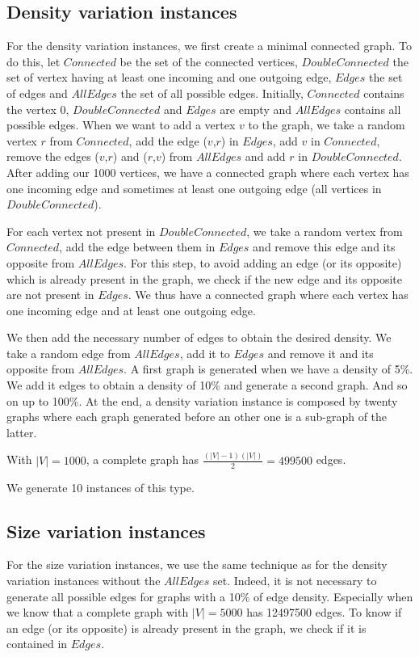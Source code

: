 \subsection{Density variation instances}
For the density variation instances, we first create a minimal connected graph. To do this, let $Connected$ be the set of the connected vertices, $DoubleConnected$ the set of vertex having at least one incoming and one outgoing edge, $Edges$ the set of edges and $AllEdges$ the set of all possible edges. Initially, $Connected$ contains the vertex 0, $DoubleConnected$ and $Edges$ are empty and $AllEdges$ contains all possible edges. When we want to add a vertex $v$ to the graph, we take a random vertex $r$ from $Connected$, add the edge ($v$,$r$) in $Edges$, add $v$ in $Connected$, remove the edges ($v$,$r$) and ($r$,$v$) from $AllEdges$ and add $r$ in $DoubleConnected$. After adding our 1000 vertices, we have a connected graph where each vertex has one incoming edge and sometimes at least one outgoing edge (all vertices in $DoubleConnected$).

For each vertex not present in $DoubleConnected$, we take a random vertex from $Connected$, add the edge between them in $Edges$ and remove this edge and its opposite from $AllEdges$. For this step, to avoid adding an edge (or its opposite) which is already present in the graph, we check if the new edge and its opposite are not present in $Edges$. We thus have a connected graph where each vertex has one incoming edge and at least one outgoing edge.

We then add the necessary number of edges to obtain the desired density. We take a random edge from $AllEdges$, add it to $Edges$ and remove it and its opposite from $AllEdges$. A first graph is generated when we have a density of 5\%. We add it edges to obtain a density of 10\% and generate a second graph. And so on up to 100\%. At the end, a density variation instance is composed by twenty graphs where each graph generated before an other one is a sub-graph of the latter.

With $|V|=1000$, a complete graph has $\frac{(|V|-1)(|V|)}{2} = 499500$ edges.

We generate 10 instances of this type.

\subsection{Size variation instances}
For the size variation instances, we use the same technique as for the density variation instances without the $AllEdges$ set. Indeed, it is not necessary to generate all possible edges for graphs with a 10\% of edge density. Especially when we know that a complete graph with $|V|=5000$ has 12497500 edges. To know if an edge (or its opposite) is already present in the graph, we check if it is contained in $Edges$.

